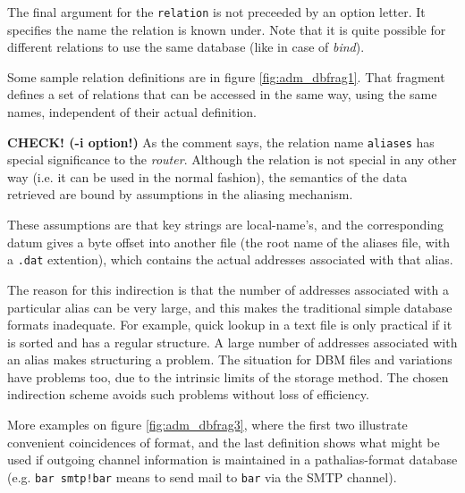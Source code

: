 


The final argument for the {\tt relation} is not preceeded by
an option letter.
It specifies the name the relation is known under.
Note that it is quite possible for different relations to use
the same database (like in case of {\em bind}).

Some sample relation definitions are in figure \vref{fig:adm_dbfrag1}.
That fragment defines a set of relations that can be accessed in the
same way, using the same names, independent of their actual definition.

{\bf\Large CHECK! (-i option!)}
As the comment says, the relation name {\tt aliases} has
special significance to the {\em router}.
Although the relation is not special in any other way (i.e. it can
be used in the normal fashion), the semantics of the data retrieved
are bound by assumptions in the aliasing mechanism.

These assumptions are that key strings are local-name's, and
the corresponding datum gives a byte offset into another file
(the root name of the aliases file, with a {\tt .dat} extention),
which contains the actual addresses associated with that alias.

The reason for this indirection is that the number of addresses associated
with a particular alias can be very large, and this makes the traditional
simple database formats inadequate.  For example, quick lookup in a text
file is only practical if it is sorted and has a regular structure.  A
large number of addresses associated with an alias makes structuring a
problem.  The situation for DBM files and variations have problems too, due
to the intrinsic limits of the storage method.  The chosen indirection
scheme avoids such problems without loss of efficiency.

More examples on figure \vref{fig:adm_dbfrag3}, where the first
two illustrate convenient coincidences of format, and the last
definition shows what might be used if outgoing channel information
is maintained in a pathalias-format database (e.g. {\tt bar smtp!bar}
means to send mail to {\tt bar} via the SMTP channel).

